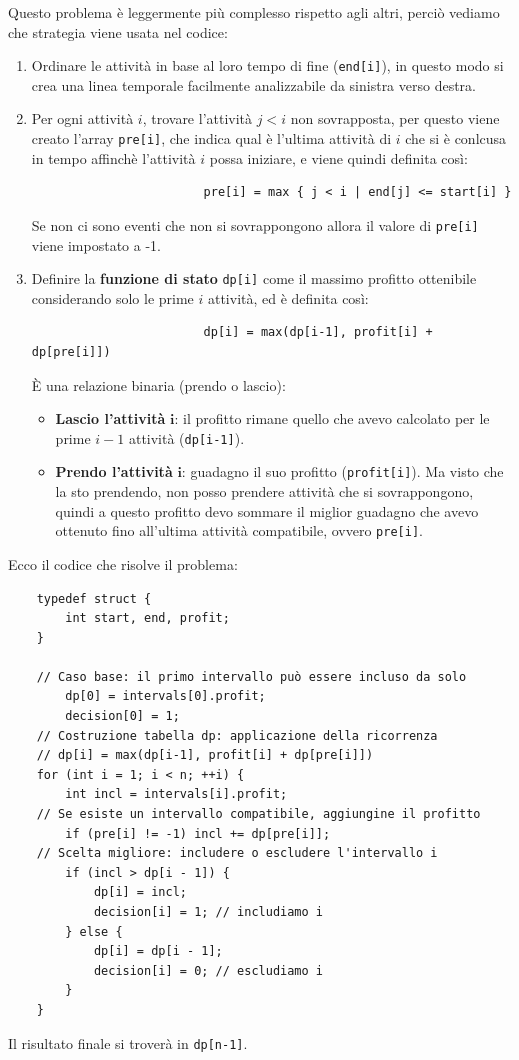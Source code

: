 \noindent Questo problema è leggermente più complesso rispetto agli altri, perciò vediamo che strategia viene usata nel codice:
\begin{enumerate}
    \item Ordinare le attività in base al loro tempo di fine (\texttt{end[i]}), in questo modo si crea una linea temporale facilmente analizzabile da
    sinistra verso destra.
    \item Per ogni attività $i$, trovare l'attività $j<i$ non sovrapposta, per questo viene creato l'array \texttt{pre[i]}, che indica qual è l'ultima attività
    di $i$ che si è conlcusa in tempo affinchè l'attività $i$ possa iniziare, e viene quindi definita così:
        \begin{verbatim}
                        pre[i] = max { j < i | end[j] <= start[i] }
        \end{verbatim}
    Se non ci sono eventi che non si sovrappongono allora il valore di \texttt{pre[i]} viene impostato a -1.
    \item Definire la \textbf{funzione di stato} \texttt{dp[i]} come il massimo profitto ottenibile considerando solo le prime $i$ attività, ed è definita così:
    \begin{verbatim}
                        dp[i] = max(dp[i-1], profit[i] + dp[pre[i]])
    \end{verbatim}
    È una relazione binaria (prendo o lascio):
    \begin{itemize}[label=--]
        \item \textbf{Lascio l'attività} $\bm{i}$: il profitto rimane quello che avevo calcolato per le prime $i-1$ attività (\texttt{dp[i-1]}).
        \item \textbf{Prendo l'attività} $\bm{i}$: guadagno il suo profitto (\texttt{profit[i]}). Ma visto che la sto prendendo, non posso prendere attività
        che si sovrappongono, quindi a questo profitto devo sommare il miglior guadagno che avevo ottenuto fino all'ultima attività compatibile, ovvero \texttt{pre[i]}. 
    \end{itemize}
\end{enumerate} 

\noindent Ecco il codice che risolve il problema:
\begin{verbatim}
    typedef struct {
        int start, end, profit;
    }

    // Caso base: il primo intervallo può essere incluso da solo
        dp[0] = intervals[0].profit;
        decision[0] = 1;
    // Costruzione tabella dp: applicazione della ricorrenza
    // dp[i] = max(dp[i-1], profit[i] + dp[pre[i]])
    for (int i = 1; i < n; ++i) {
        int incl = intervals[i].profit;
    // Se esiste un intervallo compatibile, aggiungine il profitto
        if (pre[i] != -1) incl += dp[pre[i]];
    // Scelta migliore: includere o escludere l'intervallo i
        if (incl > dp[i - 1]) {
            dp[i] = incl;
            decision[i] = 1; // includiamo i
        } else {
            dp[i] = dp[i - 1];
            decision[i] = 0; // escludiamo i
        }
    }
\end{verbatim}
Il risultato finale si troverà in \texttt{dp[n-1]}.

